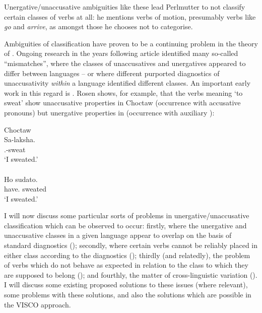 \documentclass[output=paper]{langsci/langscibook}
\begin{document}
Unergative/unaccusative ambiguities like these lead Perlmutter to not classify
certain classes of verbs at all: he mentions verbs of motion, presumably verbs
like \emph{go} and \emph{arrive}, as amongst those he chooses not to
categorise.

Ambiguities of classification have proven to be a continuing problem in the
theory of . Ongoing research in the years following
 article identified many so-called \enquote{mismatches},
where the classes of unaccusatives and unergatives appeared to differ between
languages – or where different purported diagnostics of unaccusativity
\emph{within} a language identified different classes. An important early
work in this regard is \citet{Rosen1984}. Rosen shows, for example, that the
verbs meaning `to sweat' show unaccusative properties in Choctaw
(occurrence with accusative pronouns) but unergative properties in 
(occurrence with auxiliary \HAVE):

\begin{multicols}{2}
\ea Choctaw \parencite[62]{Rosen1984}\\
    \gll Sa-laksha.\\
    \Fsg.\Acc-sweat\\
    \glt \enquote*{I sweated.}\\
\ex  {} \parencite[62]{Rosen1984}\\
    \gll Ho sudato.\\
    have.\Fsg{} sweated\\
    \glt \enquote*{I sweated.}\\
\z\end{multicols}

\noindent I will now discuss some particular sorts of problems in unergative/unaccusative
classification which can be observed to occur: firstly, where the unergative
and unaccusative classes in a given language appear to overlap on the basis of
standard diagnostics (); secondly, where certain verbs cannot be reliably
placed in either class according to the diagnostics (); thirdly (and
relatedly), the problem of verbs which do not behave as expected in relation to
the class to which they are supposed to belong (); and fourthly, the
matter of cross-linguistic variation (). I will discuss some existing
proposed solutions to these issues (where relevant), some problems with these
solutions, and also the solutions which are possible in the VISCO approach.
\end{document}
